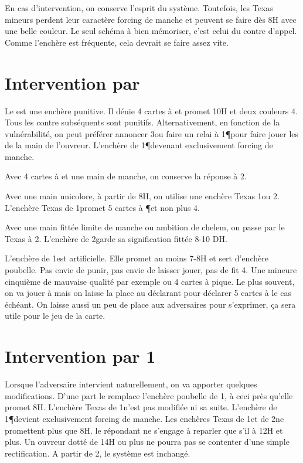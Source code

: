 \begin{multicols}{2}


En cas d'intervention, on conserve l'esprit du système. Toutefois, les Texas mineurs perdent leur caractère forcing de manche et peuvent se faire dès 8H avec une belle couleur.
Le seul schéma à bien mémoriser, c'est celui du contre d'appel. Comme l'enchère est fréquente, cela devrait se faire assez vite.


\section*{Intervention par \Double}

Le \Redouble est une enchère punitive. Il dénie 4 cartes à \C et promet 10H et deux couleurs 4\ieme. Tous les contre subséquents sont punitifs.
Alternativement, en fonction de la vulnérabilité, on peut préférer annoncer 3\NT ou faire un relai à 1\P pour faire jouer les \NT de la main de l'ouvreur. L'enchère de 1\P devenant exclusivement forcing de manche.

Avec 4 cartes à \C et une main de manche, on conserve la réponse à 2\NT.

Avec une main unicolore, à partir de 8H, on utilise une enchère Texas 1\NT ou 2\T. L'enchère Texas de 1\C promet 5 cartes à \P et non plus 4.

Avec une main fittée limite de manche ou ambition de chelem, on passe par le Texas à 2\K.
L'enchère de 2\C garde sa signification fittée 8-10 DH.

L'enchère de 1\K est artificielle. Elle promet au moins 7-8H et sert d'enchère poubelle. Pas envie de punir, pas envie de laisser jouer, pas de fit 4\ieme.
Une mineure cinquième de mauvaise qualité par exemple ou 4 cartes à pique. Le plus souvent, on va jouer à \NT mais on laisse la place au déclarant pour déclarer 5 cartes à \C le cas échéant. On laisse aussi un peu de place aux adversaires pour s'exprimer, ça sera utile pour le jeu de la carte.


\section*{Intervention par 1\K}
Lorsque l'adversaire intervient naturellement, on va apporter quelques modifications. D'une part le \Double remplace l'enchère poubelle de 1\K, à ceci près qu'elle promet 8H.
L'enchère Texas de 1\C n'est pas modifiée ni sa suite. L'enchère de 1\P devient exclusivement forcing de manche. Les enchères Texas de 1\NT et de 2\T ne promettent plus que 8H.
le répondant ne s'engage à reparler que s'il à 12H et plus. Un ouvreur dotté de 14H ou plus ne pourra pas se contenter d'une simple rectification. A partir de 2\K, le système est inchangé.



\end{multicols}
